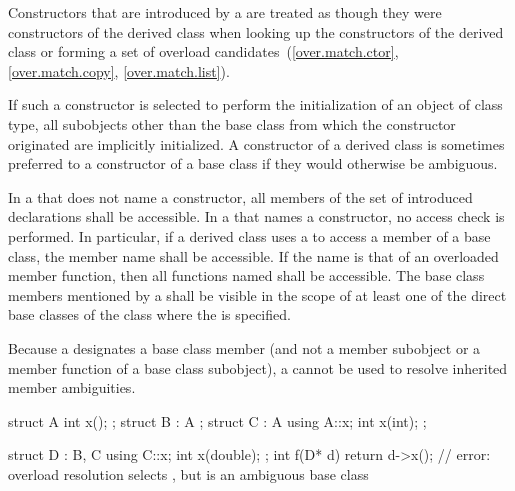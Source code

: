 \pnum
Constructors that are introduced by a 
are treated as though they were constructors of the derived class
when looking up the constructors of the derived class
or forming a set of overload candidates~(\ref{over.match.ctor}, \ref{over.match.copy}, \ref{over.match.list}).
\begin{note}
If such a constructor is selected to perform the initialization
of an object of class type, all subobjects other than the base class
from which the constructor originated
are implicitly initialized.
A constructor of a derived class is sometimes preferred to a constructor of a base class
if they would otherwise be ambiguous.
\end{note}

\pnum
{}%
In a  that does not name a constructor,
all members of the set of introduced declarations shall be accessible.
In a  that names a constructor,
no access check is performed.
In particular, if a derived class uses a
 to access a member of a base class, the
member name shall be accessible. If the name is that of an overloaded
member function, then all functions named shall be accessible. The base
class members mentioned by a  shall be
visible in the scope of at least one of the direct base classes of the
class where the  is specified.

\pnum
\begin{note}
Because a  designates a base class member
(and not a member subobject or a member function of a base class
subobject), a  cannot be used to resolve
inherited member ambiguities.
\begin{example}
\begin{codeblock}
struct A { int x(); };
struct B : A { };
struct C : A {
  using A::x;
  int x(int);
};

struct D : B, C {
  using C::x;
  int x(double);
};
int f(D* d) {
  return d->x();    // error: overload resolution selects , but  is an ambiguous base class
}
\end{codeblock}
\end{example}
\end{note}

